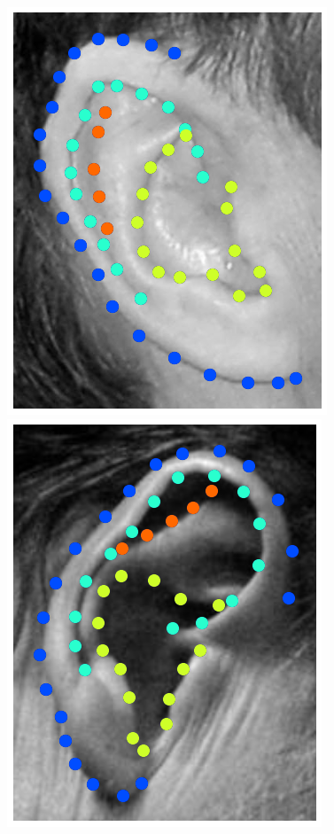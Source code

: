 \begin{figure}[!b]
    \includegraphics[height=\flowh]{resources/Ear_Deformable_Model/dbs/db_4} 
    \hfill
    \includegraphics[height=\flowh]{resources/Ear_Deformable_Model/dbs/db_5}
    \hfill

\end{figure}
